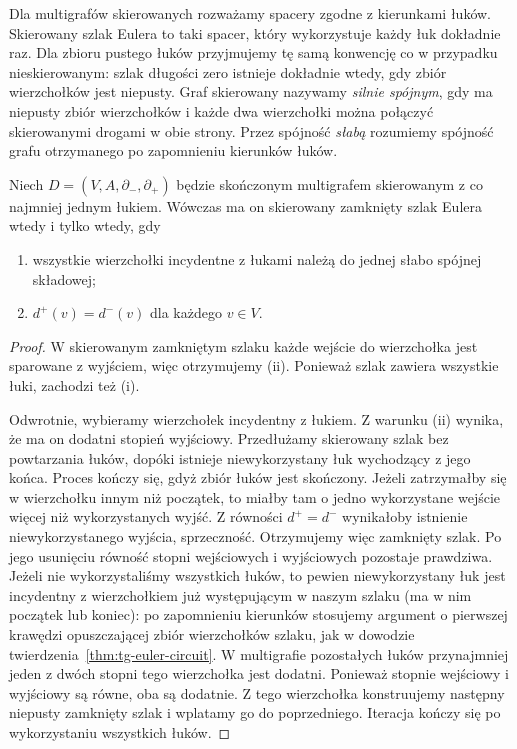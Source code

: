 Dla multigrafów skierowanych rozważamy spacery zgodne
z kierunkami łuków. Skierowany szlak Eulera to taki
spacer, który wykorzystuje każdy łuk dokładnie raz.
Dla zbioru pustego łuków przyjmujemy tę samą konwencję
co w przypadku nieskierowanym: szlak długości zero istnieje
dokładnie wtedy, gdy zbiór wierzchołków jest niepusty. Graf skierowany nazywamy \emph{silnie spójnym}, gdy
ma niepusty zbiór wierzchołków i każde dwa wierzchołki
można połączyć skierowanymi drogami w obie strony. Przez spójność \emph{słabą} rozumiemy spójność
grafu otrzymanego po zapomnieniu kierunków łuków.

\begin{twierdzenie}
\label{thm:tg-euler-directed-circuit}
Niech $D=(V,A,\partial_-,\partial_+)$ będzie skończonym
multigrafem skierowanym
z co najmniej jednym łukiem. Wówczas ma on skierowany
zamknięty szlak Eulera wtedy i tylko wtedy, gdy
\begin{enumerate}[label=(\roman*)]
\item wszystkie wierzchołki incydentne z łukami należą do
jednej słabo spójnej składowej;
\item $d^+(v)=d^-(v)$ dla każdego $v\in V$.
\end{enumerate}
\end{twierdzenie}

\begin{proof}
W skierowanym zamkniętym szlaku każde wejście do wierzchołka
jest sparowane z wyjściem, więc otrzymujemy (ii).
Ponieważ szlak zawiera wszystkie łuki, zachodzi też (i).

Odwrotnie, wybieramy wierzchołek incydentny z łukiem.
Z warunku (ii) wynika, że ma on dodatni stopień wyjściowy.
Przedłużamy skierowany szlak bez powtarzania łuków,
dopóki istnieje niewykorzystany łuk wychodzący z jego końca.
Proces kończy się, gdyż zbiór łuków jest skończony.
Jeżeli zatrzymałby się w wierzchołku innym niż początek,
to miałby tam o jedno wykorzystane wejście więcej niż
wykorzystanych wyjść. Z równości $d^+=d^-$ wynikałoby
istnienie niewykorzystanego wyjścia, sprzeczność.
Otrzymujemy więc zamknięty szlak. Po jego usunięciu
równość stopni wejściowych i wyjściowych pozostaje prawdziwa.
Jeżeli nie wykorzystaliśmy wszystkich łuków, to pewien
niewykorzystany łuk jest incydentny z wierzchołkiem
już występującym w naszym szlaku (ma w nim początek
lub koniec): po zapomnieniu kierunków stosujemy
argument o pierwszej krawędzi opuszczającej zbiór
wierzchołków szlaku, jak w dowodzie
twierdzenia~\ref{thm:tg-euler-circuit}.
W multigrafie pozostałych łuków przynajmniej jeden
z dwóch stopni tego wierzchołka jest dodatni.
Ponieważ stopnie wejściowy i wyjściowy są równe,
oba są dodatnie.
Z tego wierzchołka konstruujemy następny niepusty
zamknięty szlak i wplatamy go do poprzedniego.
Iteracja kończy się po wykorzystaniu wszystkich łuków.
\end{proof}

